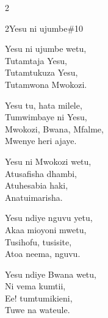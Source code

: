 \documentclass{article}
\begin{document}
\begin{multicols}{2}
\begin{hymn}{2}{Yesu ni ujumbe}{\#10}
\begin{stanza}
Yesu ni ujumbe wetu,\\
Tutamtaja Yesu,\\
Tutamtukuza Yesu,\\
Tutamwona Mwokozi.
\end{stanza}
\begin{chorus}
Yesu tu, hata milele,\\
Tumwimbaye ni Yesu,\\
Mwokozi, Bwana, Mfalme,\\
Mwenye heri ajaye.
\end{chorus}
\begin{stanza}
Yesu ni Mwokozi wetu,\\
Atusafisha dhambi,\\
Atuhesabia haki,\\
Anatuimarisha.
\end{stanza}
\begin{stanza}
Yesu ndiye nguvu yetu,\\
Akaa mioyoni mwetu,\\
Tusihofu, tusisite,\\
Atoa neema, nguvu.
\end{stanza}
\begin{stanza}
Yesu ndiye Bwana wetu,\\
Ni vema kumtii,\\
Ee! tumtumikieni,\\
Tuwe na wateule.
\end{stanza}
\end{hymn}


\end{multicols}
\end{document}
